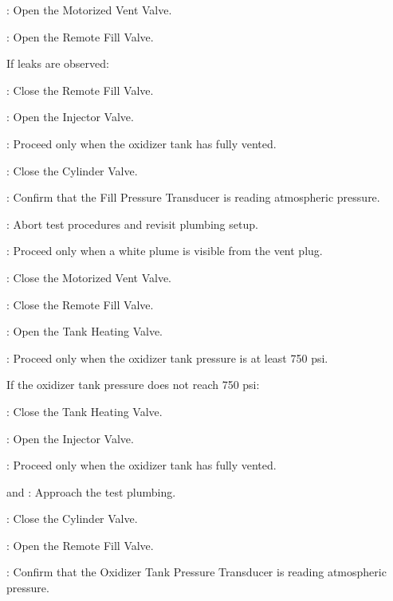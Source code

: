 \begin{checklist}
    \item \control{}: Open the Motorized Vent Valve.
    \item \control{}: Open the Remote Fill Valve.
    \begin{checklist}[label=$\bullet$]
        \item If leaks are observed:
        \begin{checklist}
            \item \control{}: Close the Remote Fill Valve.
            \item \primary{}: Open the Injector Valve.
            \item \ops: Proceed only when the oxidizer tank has fully vented.
            \item \primary{}: Close the Cylinder Valve.
            \item \daq{}: Confirm that the Fill Pressure Transducer is reading atmospheric pressure.
            \item \ops{}: Abort test procedures and revisit plumbing setup.
        \end{checklist}
    \end{checklist}
    \item \ops{}: Proceed only when a white plume is visible from the vent plug.
    \item \control{}: Close the Motorized Vent Valve.
    \item \control{}: Close the Remote Fill Valve.
    \item \heat: Open the Tank Heating Valve.
    \item \daq{}: Proceed only when the oxidizer tank pressure is at least 750 psi.
    \begin{checklist}[label=$\bullet$]
        \item If the oxidizer tank pressure does not reach 750 psi:
        \begin{checklist}
            \item \heat: Close the Tank Heating Valve.
            \item \primary{}: Open the Injector Valve.
            \item \ops: Proceed only when the oxidizer tank has fully vented.
            \item \primary{} and \secondary: Approach the test plumbing.
            \item \primary{}: Close the Cylinder Valve.
            \item \control{}: Open the Remote Fill Valve.
            \item \daq{}: Confirm that the Oxidizer Tank Pressure Transducer is reading atmospheric pressure.

\end{checklist}
\end{checklist}
\end{checklist}
